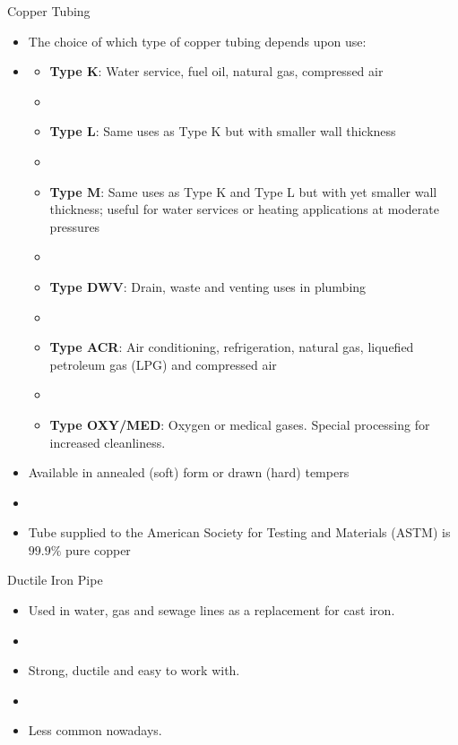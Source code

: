 \documentclass[9pt,xcolor={svgnames, x11names},professionalfonts, mathserif]{beamer}
\begin{document}
\begin{frame}{Copper Tubing}
	\begin{itemize}
		\item The choice of which type of copper tubing depends upon use: \item[]
		      \begin{itemize}
		      	\item \textbf{Type K}: Water service, fuel oil, natural gas, compressed air \item[]
		      	\item \textbf{Type L}: Same uses as Type K but with smaller wall thickness \item[]
		      	\item \textbf{Type M}: Same uses as Type K and Type L but with yet smaller wall thickness; useful for water
		      	      services or heating applications at moderate pressures \item[]
		      	\item \textbf{Type DWV}: Drain, waste and venting uses in plumbing \item[]
		      	\item \textbf{Type ACR}: Air conditioning, refrigeration, natural gas, liquefied petroleum gas (LPG)
		      	      and compressed air \item[]
		      	\item \textbf{Type OXY/MED}: Oxygen or medical gases. Special processing for increased cleanliness.
		      \end{itemize}
		\item Available in annealed (soft) form or drawn (hard) tempers \item[]
		\item Tube supplied to the American Society for Testing and Materials (ASTM) is $99.9\%$ pure copper
	\end{itemize}
\end{frame}

\begin{frame}{Ductile Iron Pipe}
	\begin{itemize}
		\item Used in water, gas and sewage lines as a replacement for cast iron.
		\item[]
		\item Strong, ductile and easy to work with.
		\item[]
		\item Less common nowadays.
		      
	\end{itemize}
\end{frame}
\end{document}
